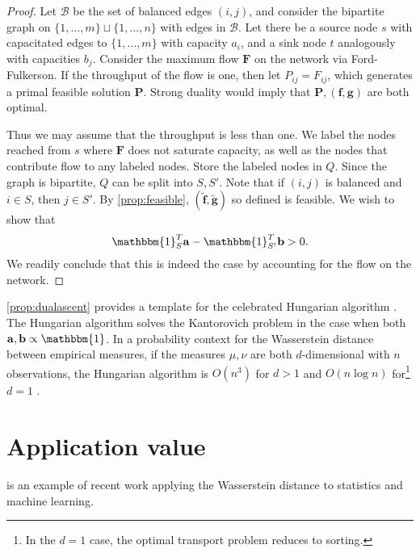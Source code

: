 \documentclass[11pt,reqno]{amsart}
\newcommand{\one}{\mathbbm{1}}
\renewcommand{\b}{\mathbf}
\theoremstyle{definition}
\theoremstyle{remark}
\begin{document}
    \begin{proof}
        Let $\mathcal B$ be the set of balanced edges $(i,j)$, and consider the
        bipartite graph on $\{1,\ldots,m\} \sqcup \{1,\ldots,n\}$ with edges in
        $\mathcal B$. Let there be a source node $s$ with capacitated edges to
        $\{1,\ldots,m\}$ with capacity $a_i$, and a sink node $t$ analogously
        with capacities $b_j$. Consider the maximum flow $\b F$ on the network
        via Ford-Fulkerson. If the throughput of the flow is one, then let $P_
        {ij} = F_{ij}$, which generates a primal feasible solution $\b P$.
        Strong duality would imply that $\b P, (\b f, \b g)$ are both optimal.
        
        Thus we may assume that the throughput is less than one. We label the
        nodes reached from $s$ where $\b F$ does not saturate capacity, as well
        as the nodes that contribute flow to any labeled nodes. Store the
        labeled nodes in $Q$. Since the graph is bipartite, $Q$ can be split
        into $S,S'$. Note that if $(i,j)$ is balanced and $i\in S$, then $j\in
        S'$. By \cref{prop:feasible}, $(\tilde {\b f}, \tilde {\b g})$ so
        defined is feasible. We wish to show that \[
        \one_S^T \b a - \one_{S'}^T \b b > 0.
        \]
        We readily conclude that this is indeed the case by accounting for the
        flow on the network.
    \end{proof}
    
    \cref{prop:dualascent} provides a template for the celebrated Hungarian
    algorithm \cite{kuhn2010hungarian}. The Hungarian algorithm solves the
    Kantorovich problem in the case when both $\b a, \b b \propto \one$. In a
    probability context for the Wasserstein distance between empirical measures,
    if the measures $\mu, \nu$ are both $d$-dimensional with $n$ observations,
    the Hungarian algorithm is $O(n^3)$ for $d>1$ and $O(n\log n)$ for\footnote{In the $d=1$ case, the optimal transport problem reduces to
    sorting.} $d =
    1$
    \cite{bernton2017inference}.
    
    
    \section{Application value}
     
    \cite{bernton2017inference} is an example of recent work applying the
    Wasserstein distance to statistics and machine learning. 



\end{document}
